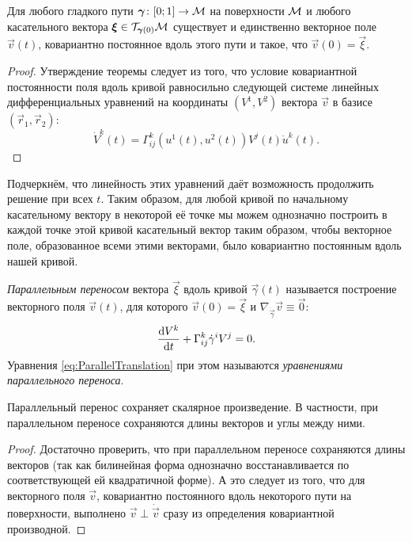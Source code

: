 \begin{theorem}
	Для любого гладкого пути $\boldsymbol{\gamma}\colon [0; 1] \to \mathcal{M}$ на поверхности $\mathcal{M}$ и любого касательного вектора $\boldsymbol{\xi} \in \mathcal{T}_{\boldsymbol{\gamma}(0)}\mathcal{M}$ существует и единственно векторное поле $\vec{v}(t)$, ковариантно постоянное вдоль этого пути и такое, что $\vec{v}(0) = \vec{\xi}$.
\end{theorem}

\begin{proof}
	Утверждение теоремы следует из того, что условие ковариантной постоянности поля вдоль кривой равносильно следующей системе линейных дифференциальных уравнений на координаты $(V^1, V^2)$ вектора $\vec{v}$ в базисе $(\vec{r}_1, \vec{r}_2)$:
	\[
		\dot{V}^k(t) = \Gamma_{ij}^k(u^1(t), u^2(t))V^j(t)\dot{u}^k(t).
	\]
\end{proof}

Подчеркнём, что линейность этих уравнений даёт возможность продолжить решение при всех $t$. Таким образом, для любой кривой по начальному касательному вектору в некоторой её точке мы можем однозначно построить в каждой точке этой кривой касательный вектор таким образом, чтобы векторное поле, образованное всеми этими векторами, было ковариантно постоянным вдоль нашей кривой.

\begin{definition}
	\textit{Параллельным переносом} вектора $\vec{\xi}$ вдоль кривой $\vec{\gamma}(t)$ называется построение векторного поля $\vec{v}(t)$, для которого $\vec{v}(0) = \vec{\xi}$ и $\nabla_{\dot{\vec{\gamma}}}\vec{v} \equiv \vec{0}$:
	\begin{equation} \label{eq:ParallelTranslation}
		\frac{\mathop{}\!\mathrm{d} V^k}{\mathop{}\!\mathrm{d} t} + \Gamma_{ij}^k\dot{\gamma}^iV^j = 0.
	\end{equation}
	Уравнения \eqref{eq:ParallelTranslation} при этом называются \textit{уравнениями параллельного переноса}.
\end{definition}

\begin{lemma}
	Параллельный перенос сохраняет скалярное произведение. В частности, при параллельном переносе сохраняются длины векторов и углы между ними.
\end{lemma}

\begin{proof}
	Достаточно проверить, что при параллельном переносе сохраняются длины векторов (так как билинейная форма однозначно восстанавливается по соответствующей ей квадратичной форме). А это следует из того, что для векторного поля $\vec{v}$, ковариантно постоянного вдоль некоторого пути на поверхности, выполнено $\vec{v} \perp \dot{\vec{v}}$ сразу из определения ковариантной производной.
\end{proof}

